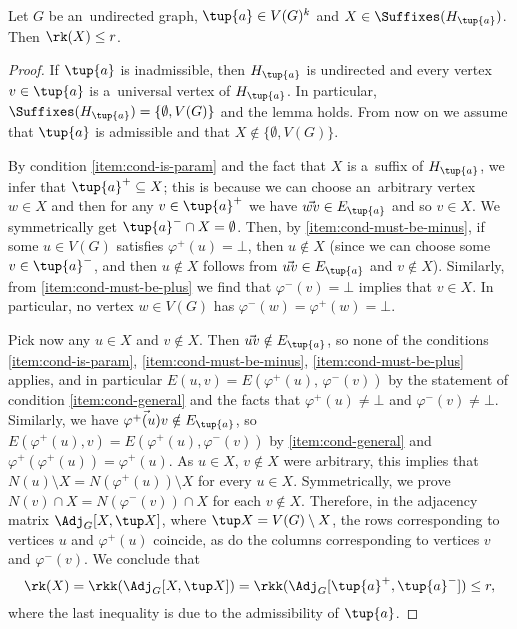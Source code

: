 \begin{lemma}
    \label{lem:low-rank-to-suffixes-rtl}
    Let $G$ be an~undirected graph, $\tup{a} \in V(G)^k$ and $X \in \Suffixes(H_{\tup{a}})$.
    Then $\rk(X) \leq r$.
\end{lemma}
\begin{proof}
    If $\tup{a}$ is inadmissible, then $H_{\tup{a}}$ is undirected and every vertex $v \in \tup{a}$ is a~universal vertex of $H_{\tup{a}}$.
    In particular, $\Suffixes(H_{\tup{a}}) = \{\emptyset, V(G)\}$ and the lemma holds.
    From now on we assume that $\tup{a}$ is admissible and that $X \notin \{\emptyset, V(G)\}$.

    By condition \ref{item:cond-is-param} and the fact that $X$ is a~suffix of $H_{\tup{a}}$, we infer that $\tup{a}^+ \subseteq X$; this is because we can choose an~arbitrary vertex $w \in X$ and then for any $v \in \tup{a}^+$ we have $\vec{wv} \in E_{\tup{a}}$ and so $v \in X$.
    We symmetrically get $\tup{a}^- \cap X = \emptyset$.
    Then, by \ref{item:cond-must-be-minus}, if some $u \in V(G)$ satisfies $\varphi^+(u) = \bot$, then $u \notin X$ (since we can choose some $v \in \tup{a}^-$, and then $u \notin X$ follows from $\vec{uv} \in E_{\tup{a}}$ and $v \notin X$).
    Similarly, from \ref{item:cond-must-be-plus} we find that $\varphi^-(v) = \bot$ implies that $v \in X$.
    In particular, no vertex $w \in V(G)$ has $\varphi^-(w) = \varphi^+(w) = \bot$.

    Pick now any $u \in X$ and $v \notin X$.
    Then $\vec{uv} \notin E_{\tup{a}}$, so none of the conditions \ref{item:cond-is-param}, \ref{item:cond-must-be-minus}, \ref{item:cond-must-be-plus} applies, and in particular $E(u, v) = E(\varphi^+(u),\, \varphi^-(v))$ by the statement of condition \ref{item:cond-general} and the facts that $\varphi^+(u) \neq \bot$ and $\varphi^-(v) \neq \bot$.
    Similarly, we have $\vec{\varphi^+(u)v} \notin E_{\tup{a}}$, so $E(\varphi^+(u), v) = E(\varphi^+(u), \varphi^-(v))$ by \ref{item:cond-general} and $\varphi^+(\varphi^+(u)) = \varphi^+(u)$.
    As $u \in X$, $v \notin X$ were arbitrary, this implies that $N(u) \setminus X = N(\varphi^+(u)) \setminus X$ for every $u \in X$.
    Symmetrically, we prove $N(v) \cap X = N(\varphi^-(v)) \cap X$ for each $v \notin X$.
    Therefore, in the adjacency matrix $\Adj_G[X, \tup X]$, where $\tup X=V(G)\setminus X$, the rows corresponding to vertices $u$ and $\varphi^+(u)$ coincide, as do the columns corresponding to vertices $v$ and $\varphi^-(v)$.
    We conclude that
    \[ \rk(X) = \rkk(\Adj_G[X, \tup X]) = \rkk(\Adj_G[\tup{a}^+, \tup{a}^-]) \leq r, \]
    where the last inequality is due to the admissibility of $\tup{a}$.
\end{proof}

